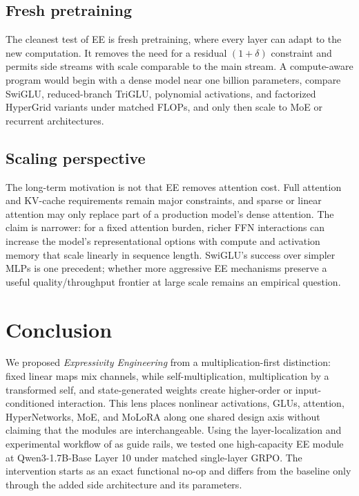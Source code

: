 \documentclass[10pt]{article}
\newcommand{\EE}{\textit{Expressivity Engineering}}
\begin{document}
\subsection{Fresh pretraining}

The cleanest test of EE is fresh pretraining, where every layer can adapt to the
new computation.  It removes the need for a residual $(1+\delta)$ constraint
and permits side streams with scale comparable to the main stream.  A
compute-aware program would begin with a dense model near one billion
parameters, compare SwiGLU, reduced-branch TriGLU, polynomial activations, and
factorized HyperGrid variants under matched FLOPs, and only then scale to MoE
or recurrent architectures.

\subsection{Scaling perspective}

The long-term motivation is not that EE removes attention cost.  Full attention
and KV-cache requirements remain major constraints, and sparse or linear
attention may only replace part of a production model's dense attention.  The
claim is narrower: for a fixed attention burden, richer FFN interactions can
increase the model's representational options with compute and activation
memory that scale linearly in sequence length.  SwiGLU's success over simpler
MLPs is one precedent; whether more aggressive EE mechanisms preserve a useful
quality/throughput frontier at large scale remains an empirical question.

\section{Conclusion}

We proposed \EE{} from a multiplication-first distinction: fixed linear maps
mix channels, while self-multiplication, multiplication by a transformed self,
and state-generated weights create higher-order or input-conditioned
interaction.  This lens places nonlinear activations, GLUs, attention,
HyperNetworks, MoE, and MoLoRA along one shared design axis without claiming
that the modules are interchangeable.  Using the layer-localization and experimental workflow of
\citet{zhang2026onelayer} as guide rails, we tested one high-capacity EE module
at Qwen3-1.7B-Base Layer 10 under matched single-layer GRPO.  The intervention
starts as an exact functional no-op and differs from the baseline only through
the added side architecture and its parameters.
\end{document}
